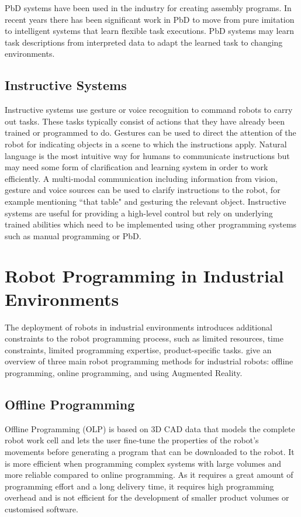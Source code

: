 PbD systems have been used in the industry for creating assembly programs. 
In recent years there has been significant work in PbD to move from pure imitation to intelligent systems that learn flexible task executions. 
PbD systems may learn task descriptions from interpreted data to adapt the learned task to changing environments.

\subsection{Instructive Systems}%
Instructive systems use gesture or voice recognition to command robots to carry out tasks.
These tasks typically consist of actions that they have already been trained or programmed to do. 
Gestures can be used to direct the attention of the robot for indicating objects in a scene to which the instructions apply. 
Natural language is the most intuitive way for humans to communicate instructions but may need some form of clarification and learning system in order to work efficiently. 
A multi-modal communication including information from vision, gesture and voice sources can be used to clarify instructions to the robot, for example mentioning ``that table" and gesturing the relevant object.
Instructive systems are useful for providing a high-level control but rely on underlying trained abilities which need to be implemented using other programming systems such as manual programming or PbD.


\section{Robot Programming in Industrial Environments}\label{subsec:RP in Industrial Enviroments}
The deployment of robots in industrial environments introduces additional constraints to the robot programming process, such as limited resources, time constraints, limited programming expertise, product-specific tasks.
\cite{pan2012recent} give an overview of three main robot programming methods for industrial robots: offline programming, online programming, and using Augmented Reality. 

\subsection{Offline Programming}\label{sssec:Offline Programming}
Offline Programming (OLP) is based on 3D CAD data that models the complete robot work cell and lets the user fine-tune the properties of the robot's movements before generating a program that can be downloaded to the robot. 
It is more efficient when programming complex systems with large volumes and more reliable compared to online programming. 
As it requires a great amount of programming effort and a long delivery time, it requires high programming overhead and is not efficient for the development of smaller product volumes or customised software.

